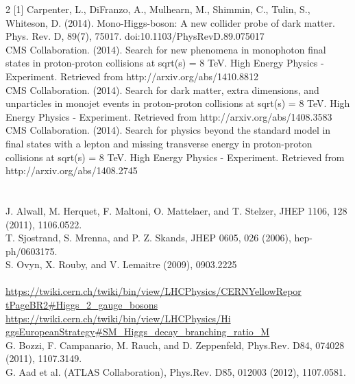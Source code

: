 \documentclass[twoside]{article}
\begin{document}
\begin{multicols}{2}
[1] Carpenter, L., DiFranzo, A., Mulhearn, M., Shimmin, C., Tulin, S., Whiteson, D. (2014). Mono-Higgs-boson: A new collider probe of dark matter. Phys. Rev. D, 89(7), 75017. doi:10.1103/PhysRevD.89.075017 \\ \relax
[2] CMS Collaboration. (2014). Search for new phenomena in monophoton final states in proton-proton collisions at sqrt(s) = 8 TeV. High Energy Physics - Experiment. Retrieved from http://arxiv.org/abs/1410.8812 \\ \relax
[3] CMS Collaboration. (2014). Search for dark matter, extra dimensions, and unparticles in monojet events in proton-proton collisions at sqrt(s) = 8 TeV. High Energy Physics - Experiment. Retrieved from http://arxiv.org/abs/1408.3583 \\ \relax
[4] CMS Collaboration. (2014). Search for physics beyond the standard model in final states with a lepton and missing transverse energy in proton-proton collisions at sqrt(s) = 8 TeV. High Energy Physics - Experiment. Retrieved from http://arxiv.org/abs/1408.2745 \\ \relax
[5] \\ \relax
[6] \\ \relax 
[7] J. Alwall, M. Herquet, F. Maltoni, O. Mattelaer, and
T. Stelzer, JHEP 1106, 128 (2011), 1106.0522. \\ \relax
[8] T. Sjostrand, S. Mrenna, and P. Z. Skands, JHEP 0605,
026 (2006), hep-ph/0603175.\\ \relax
[9] S. Ovyn, X. Rouby, and V. Lemaitre (2009), 0903.2225\\ \relax
[10] \\ \relax
[11] \url{https://twiki.cern.ch/twiki/bin/view/LHCPhysics/CERNYellowRepor    tPageBR2#Higgs_2_gauge_bosons} \\ \relax
[12] \url{https://twiki.cern.ch/twiki/bin/view/LHCPhysics/Hi    ggsEuropeanStrategy#SM_Higgs_decay_branching_ratio_M} \\ \relax
[13] G. Bozzi, F. Campanario, M. Rauch, and D. Zeppenfeld,
Phys.Rev. D84, 074028 (2011), 1107.3149. \\ \relax
[14] G. Aad et al. (ATLAS Collaboration), Phys.Rev. D85,
012003 (2012), 1107.0581. \\ \relax
[15]
 

\end{multicols}
\end{document}
